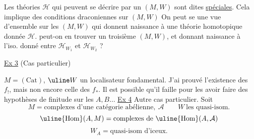 Les théories $\mathcal H$ qui peuvent se décrire par un $(M,W)$ sont dites
\uline{spéciales}. Cela implique des conditions draconiennes sur $(M,W)$
On peut se 
une vue d'ensemble sur les $(M,W)$ qui donnent naissance à une théorie
homotopique donnée $\mathcal H$.
peut-on en trouver un troisième $(M,W)$, et
donnant naissance à l'iso.  donné entre
$\mathcal H_{W_1}$ et $\mathcal H_{W_2}$ ?

\uline{Ex 3} (Cas particulier)

$M=(\mathrm{Cat})$, $\uline W$ un localisateur fondamental.
J'ai prouvé l'existence des $f_!$, mais non encore celle des $f_*$.
Il est possible qu'il faille pour les avoir faire des hypothèses de finitude
sur les $A,B\ldots$
\uline{Ex 4} Autre cas particulier. Soit
\[
M=\text{complexes d'une catégorie abélienne},\ \mathcal A
\qquad W\ \text{les quasi-isom.}
\]
\[
\uline{\operatorname{Hom}}(A,M)=\text{complexes de }\uline{\operatorname{Hom}}(A,\mathcal A)
\]
\[
W_A=\text{quasi-isom d'iceux.}
\]

